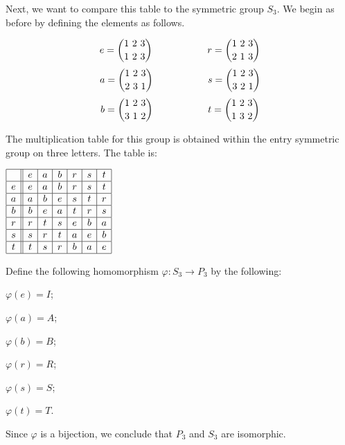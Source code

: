 \documentclass[12pt]{article}
\begin{document}
Next, we want to compare this table to the symmetric group $S_3$.  We begin as before by defining the elements
as follows.

$$e={ 1\ 2\ 3 \choose 1\ 2\ 3} \hspace{20mm} r={ 1\ 2\ 3 \choose 2\ 1\ 3}$$
$$a={ 1\ 2\ 3 \choose 2\ 3\ 1} \hspace{20mm} s={ 1\ 2\ 3 \choose 3\ 2\ 1}$$
$$b={ 1\ 2\ 3 \choose 3\ 1\ 2} \hspace{20mm} t={ 1\ 2\ 3 \choose 1\ 3\ 2}$$

The multiplication table for this group is obtained within the entry symmetric group on three letters.  The table is:

\begin{center}
$\begin{array}{|c||c|c|c|c|c|c|}
\hline
 & e & a & b & r & s & t \\
\hline
e & e & a & b & r & s & t \\
\hline
a & a & b & e & s & t & r \\
\hline
b & b & e & a & t & r & s\\
\hline
r & r & t & s & e & b & a\\
\hline
s & s & r & t & a & e & b\\
\hline
t & t & s & r & b & a & e\\
\hline
\end{array}$
\end{center}

Define the following homomorphism $\varphi \colon S_3 \to P_3$ by the following:

$\varphi(e)=I$;

$\varphi(a)=A$;

$\varphi(b)=B$;

$\varphi(r)=R$;

$\varphi(s)=S$;

$\varphi(t)=T$.

Since $\varphi$ is a bijection, we conclude that $P_3$ and $S_3$ are isomorphic.
\end{document}
